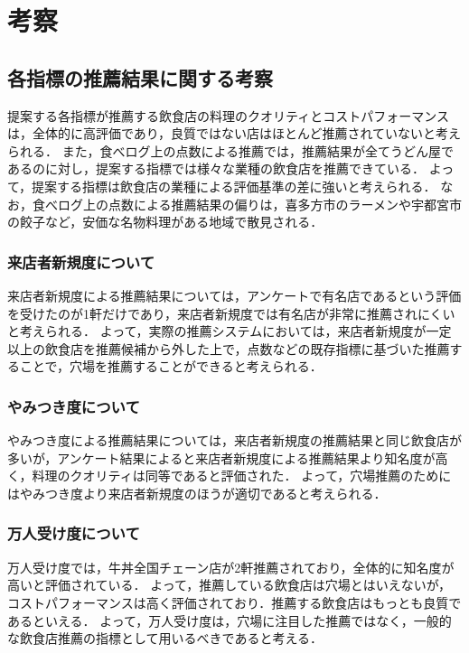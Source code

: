 \chapter{考察}

\label{chap:discussion}

\section{各指標の推薦結果に関する考察}
提案する各指標が推薦する飲食店の料理のクオリティとコストパフォーマンスは，全体的に高評価であり，良質ではない店はほとんど推薦されていないと考えられる．
また，食べログ上の点数による推薦では，推薦結果が全てうどん屋であるのに対し，提案する指標では様々な業種の飲食店を推薦できている．
よって，提案する指標は飲食店の業種による評価基準の差に強いと考えられる．
なお，食べログ上の点数による推薦結果の偏りは，喜多方市のラーメンや宇都宮市の餃子など，安価な名物料理がある地域で散見される．
\par
\subsection{来店者新規度について}
来店者新規度による推薦結果については，アンケートで有名店であるという評価を受けたのが1軒だけであり，来店者新規度では有名店が非常に推薦されにくいと考えられる．
よって，実際の推薦システムにおいては，来店者新規度が一定以上の飲食店を推薦候補から外した上で，点数などの既存指標に基づいた推薦することで，穴場を推薦することができると考えられる．\par

\subsection{やみつき度について}
やみつき度による推薦結果については，来店者新規度の推薦結果と同じ飲食店が多いが，アンケート結果によると来店者新規度による推薦結果より知名度が高く，料理のクオリティは同等であると評価された．
よって，穴場推薦のためにはやみつき度より来店者新規度のほうが適切であると考えられる．\par

\subsection{万人受け度について}
万人受け度では，牛丼全国チェーン店が2軒推薦されており，全体的に知名度が高いと評価されている．
よって，推薦している飲食店は穴場とはいえないが，コストパフォーマンスは高く評価されており．推薦する飲食店はもっとも良質であるといえる．
よって，万人受け度は，穴場に注目した推薦ではなく，一般的な飲食店推薦の指標として用いるべきであると考える．

